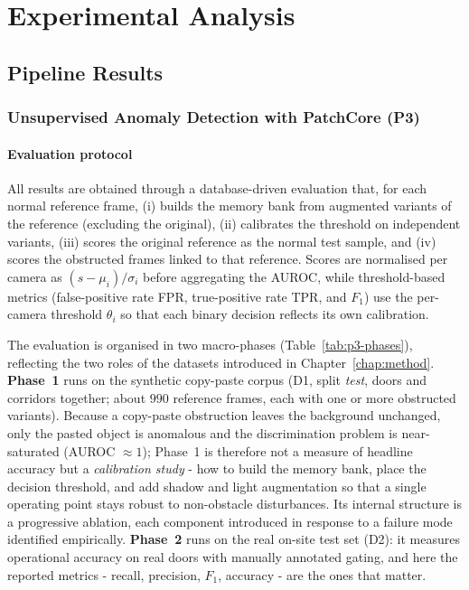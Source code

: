 \chapter{Experimental Analysis}
\label{chap:analysis}

\section{Pipeline Results}
\label{sec:p3-results}

\subsection{Unsupervised Anomaly Detection with PatchCore (P3)}

\subsubsection{Evaluation protocol}

All results are obtained through a database-driven evaluation that, for each
normal reference frame, (i) builds the memory bank from augmented variants of the
reference (excluding the original), (ii) calibrates the threshold on independent
variants, (iii) scores the original reference as the normal test sample, and
(iv) scores the obstructed frames linked to that reference. Scores are
normalised per camera as $(s - \mu_i)/\sigma_i$ before aggregating the AUROC,
while threshold-based metrics (false-positive rate FPR, true-positive rate TPR,
and $F_1$) use the per-camera threshold $\theta_i$ so that each binary decision
reflects its own calibration.

The evaluation is organised in two macro-phases (Table~\ref{tab:p3-phases}),
reflecting the two roles of the datasets introduced in
Chapter~\ref{chap:method}. \textbf{Phase~1} runs on the synthetic copy-paste
corpus (D1, split \emph{test}, doors and corridors together; about $990$ reference
frames, each with one or more obstructed variants). Because a copy-paste
obstruction leaves the background unchanged, only the pasted object is anomalous
and the discrimination problem is near-saturated (AUROC $\approx 1$); Phase~1 is
therefore not a measure of headline accuracy but a \emph{calibration study} - how
to build the memory bank, place the decision threshold, and add shadow and light
augmentation so that a single operating point stays robust to non-obstacle
disturbances. Its internal structure is a progressive ablation, each component
introduced in response to a failure mode identified empirically. \textbf{Phase~2}
runs on the real on-site test set (D2): it measures operational accuracy on real
doors with manually annotated gating, and here the reported metrics - recall,
precision, $F_1$, accuracy - are the ones that matter.


